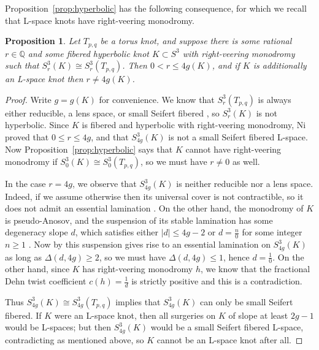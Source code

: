 \documentclass[11pt]{amsart}
\newtheorem {proposition}[theorem]{Proposition}
\numberwithin{equation}{section}
\numberwithin{theorem}{section}
\theoremstyle{definition}
\newcommand{\Q}{\mathbb{Q}}
\begin{document}
Proposition~\ref{prop:hyperbolic} has the following consequence, for which we recall that L-space knots have right-veering monodromy.

\begin{proposition} \label{prop:compare-hyperbolic-surgeries}
Let $T_{p,q}$ be a torus knot, and suppose there is some rational $r\in\Q$ and some fibered hyperbolic knot $K \subset S^3$ with right-veering monodromy such that $S^3_r(K) \cong S^3_r(T_{p,q})$.  Then $0 < r \leq 4g(K)$, and if $K$ is additionally an L-space knot then $r \neq 4g(K)$.
\end{proposition}

\begin{proof}
Write $g=g(K)$ for convenience.  We know that $S^3_r(T_{p,q})$ is always either reducible, a lens space, or small Seifert fibered \cite{moser}, so $S^3_r(K)$ is not hyperbolic.  Since $K$ is fibered and hyperbolic with right-veering monodromy, Ni \cite[Theorem~1.1]{ni-exceptional} proved that $0 \leq r \leq 4g$, and that $S^3_{4g}(K)$ is not a small Seifert fibered L-space.  Now Proposition~\ref{prop:hyperbolic} says that $K$ cannot have right-veering monodromy if $S^3_0(K) \cong S^3_0(T_{p,q})$, so we must have $r\neq 0$ as well.

In the case $r=4g$, we observe that $S^3_{4g}(K)$ is neither reducible nor a lens space.  Indeed, if we assume otherwise then its universal cover is not contractible, so it does not admit an essential lamination \cite[Theorem~6.1]{gabai-oertel}.  On the other hand, the monodromy of $K$ is pseudo-Anosov, and the suspension of its stable lamination has some degeneracy slope $d$, which satisfies either $|d| \leq 4g-2$ or $d=\frac{n}{0}$ for some integer $n\geq 1$ \cite[Theorem~8.8]{gabai-problems}.  Now by \cite[Theorem~5.3]{gabai-oertel} this suspension gives rise to an essential lamination on $S^3_{4g}(K)$ as long as $\Delta(d,4g) \geq 2$, so we must have $\Delta(d,4g) \leq 1$, hence $d = \frac{1}{0}$.  On the other hand, since $K$ has right-veering monodromy $h$, we know that the fractional Dehn twist coefficient $c(h) = \frac{1}{d}$ is strictly positive \cite[Proposition~3.1]{hkm-veering} and this is a contradiction.

Thus $S^3_{4g}(K) \cong S^3_{4g}(T_{p,q})$ implies that $S^3_{4g}(K)$ can only be small Seifert fibered.  If $K$ were an L-space knot, then all surgeries on $K$ of slope at least $2g-1$ would be L-spaces; but then $S^3_{4g}(K)$ would be a small Seifert fibered L-space, contradicting \cite{ni-exceptional} as mentioned above, so $K$ cannot be an L-space knot after all.
\end{proof}
\end{document}
